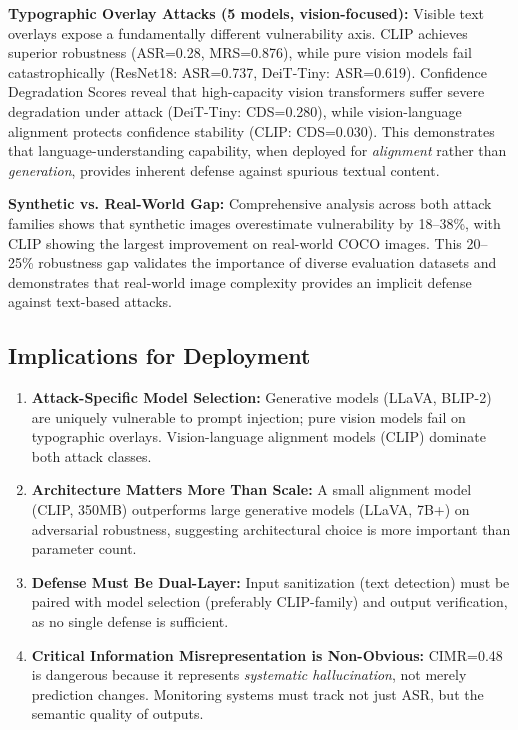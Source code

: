 \documentclass[11pt]{article}
\begin{document}
\textbf{Typographic Overlay Attacks (5 models, vision-focused):}
Visible text overlays expose a fundamentally different vulnerability axis. CLIP achieves superior robustness (ASR=0.28, MRS=0.876), while pure vision models fail catastrophically (ResNet18: ASR=0.737, DeiT-Tiny: ASR=0.619). Confidence Degradation Scores reveal that high-capacity vision transformers suffer severe degradation under attack (DeiT-Tiny: CDS=0.280), while vision-language alignment protects confidence stability (CLIP: CDS=0.030). This demonstrates that language-understanding capability, when deployed for \textit{alignment} rather than \textit{generation}, provides inherent defense against spurious textual content.

\textbf{Synthetic vs. Real-World Gap:}
Comprehensive analysis across both attack families shows that synthetic images overestimate vulnerability by 18--38\%, with CLIP showing the largest improvement on real-world COCO images. This 20--25\% robustness gap validates the importance of diverse evaluation datasets and demonstrates that real-world image complexity provides an implicit defense against text-based attacks.

\subsection{Implications for Deployment}

\begin{enumerate}[leftmargin=2em]
    \item \textbf{Attack-Specific Model Selection:} Generative models (LLaVA, BLIP-2) are uniquely vulnerable to prompt injection; pure vision models fail on typographic overlays. Vision-language alignment models (CLIP) dominate both attack classes.
    
    \item \textbf{Architecture Matters More Than Scale:} A small alignment model (CLIP, 350MB) outperforms large generative models (LLaVA, 7B+) on adversarial robustness, suggesting architectural choice is more important than parameter count.
    
    \item \textbf{Defense Must Be Dual-Layer:} Input sanitization (text detection) must be paired with model selection (preferably CLIP-family) and output verification, as no single defense is sufficient.
    
    \item \textbf{Critical Information Misrepresentation is Non-Obvious:} CIMR=0.48 is dangerous because it represents \textit{systematic hallucination}, not merely prediction changes. Monitoring systems must track not just ASR, but the semantic quality of outputs.
\end{enumerate}
\end{document}
